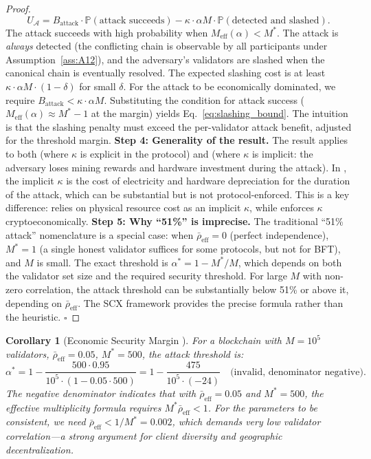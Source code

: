 \documentclass[11pt,a4paper]{article}
\newtheorem{corollary}[theorem]{Corollary}
\theoremstyle{definition}
\newcommand{\SCX}{\textsc{SCX}}
\newcommand{\Pbb}{\mathbb{P}}
\newcommand{\mthreshold}{M^{*}}
\newcommand{\PoW}{\mathrm{PoW}}
\newcommand{\PoS}{\mathrm{PoS}}
\begin{document}
\begin{proof}
\begin{equation}
    U_{\mathcal{A}} = B_{\mathrm{attack}} \cdot \Pbb(\text{attack succeeds}) - \kappa \cdot \alpha M \cdot \Pbb(\text{detected and slashed}).
    \label{eq:adversary_payoff}
\end{equation}
The attack succeeds with high probability when $M_{\mathrm{eff}}(\alpha) < \mthreshold$. The attack is \textit{always} detected (the conflicting chain is observable by all participants under Assumption~\ref{ass:A12}), and the adversary's validators are slashed when the canonical chain is eventually resolved. The expected slashing cost is at least $\kappa \cdot \alpha M \cdot (1 - \delta)$ for small $\delta$.
For the attack to be economically dominated, we require $B_{\mathrm{attack}} < \kappa \cdot \alpha M$. Substituting the condition for attack success ($M_{\mathrm{eff}}(\alpha) \approx \mthreshold - 1$ at the margin) yields Eq.~\eqref{eq:slashing_bound}. The intuition is that the slashing penalty must exceed the per-validator attack benefit, adjusted for the threshold margin.
\textbf{Step 4: Generality of the result.} The result applies to both \PoS{} (where $\kappa$ is explicit in the protocol) and \PoW{} (where $\kappa$ is implicit: the adversary loses mining rewards and hardware investment during the attack). In \PoW{}, the implicit $\kappa$ is the cost of electricity and hardware depreciation for the duration of the attack, which can be substantial but is not protocol-enforced. This is a key difference: \PoW{} relies on physical resource cost as an implicit $\kappa$, while \PoS{} enforces $\kappa$ cryptoeconomically.
\textbf{Step 5: Why ``51\%'' is imprecise.} The traditional ``51\% attack'' nomenclature is a special case: when $\bar{\rho}_{\mathrm{eff}} = 0$ (perfect independence), $\mthreshold = 1$ (a single honest validator suffices for some protocols, but not for BFT), and $M$ is small. The exact threshold is $\alpha^* = 1 - \mthreshold / M$, which depends on both the validator set size and the required security threshold. For large $M$ with non-zero correlation, the attack threshold can be substantially below 51\% or above it, depending on $\bar{\rho}_{\mathrm{eff}}$. The \SCX{} framework provides the precise formula rather than the heuristic. $\square$
\end{proof}
\begin{corollary}[Economic Security Margin ]
\label{cor:economic_security}
For a \PoS{} blockchain with $M = 10^5$ validators, $\bar{\rho}_{\mathrm{eff}} = 0.05$, $\mthreshold = 500$, the attack threshold is:
\begin{equation}
    \alpha^* = 1 - \frac{500 \cdot 0.95}{10^5 \cdot (1 - 0.05 \cdot 500)} = 1 - \frac{475}{10^5 \cdot (-24)} \quad \text{(invalid, denominator negative)}.
    \label{eq:attack_calibration}
\end{equation}
The negative denominator indicates that with $\bar{\rho}_{\mathrm{eff}} = 0.05$ and $\mthreshold = 500$, the effective multiplicity formula requires $\mthreshold \bar{\rho}_{\mathrm{eff}} < 1$. For the parameters to be consistent, we need $\bar{\rho}_{\mathrm{eff}} < 1/\mthreshold = 0.002$, which demands very low validator correlation—a strong argument for client diversity and geographic decentralization.
\end{corollary}
\end{document}
